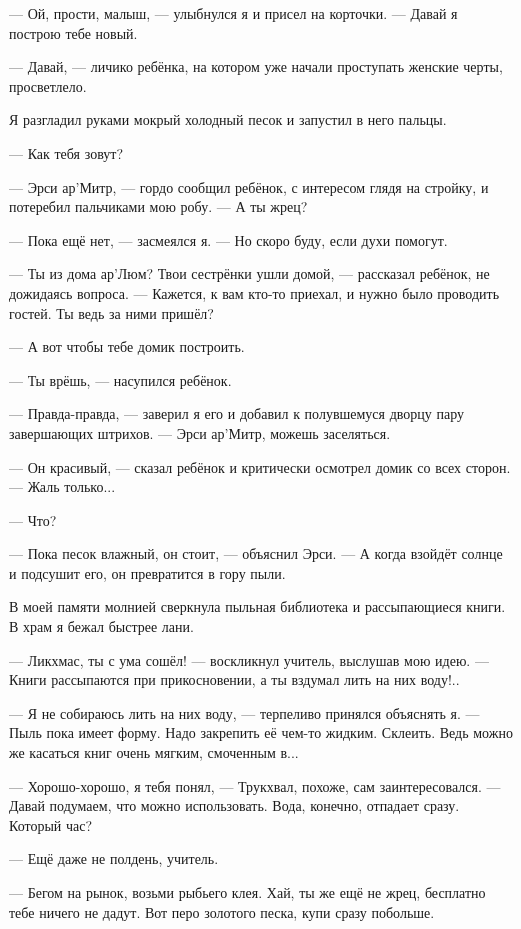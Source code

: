 --- Ой, прости, малыш, --- улыбнулся я и присел на корточки.
--- Давай я построю тебе новый.

--- Давай, --- личико ребёнка, на котором уже начали проступать женские черты, просветлело.

Я разгладил руками мокрый холодный песок и запустил в него пальцы.

--- Как тебя зовут?

--- Эрси ар’Митр, --- гордо сообщил ребёнок, с интересом глядя на стройку, и потеребил пальчиками мою робу.
--- А ты жрец?

--- Пока ещё нет, --- засмеялся я.
--- Но скоро буду, если духи помогут.

--- Ты из дома ар’Люм?
Твои сестрёнки ушли домой, --- рассказал ребёнок, не дожидаясь вопроса.
--- Кажется, к вам кто-то приехал, и нужно было проводить гостей.
Ты ведь за ними пришёл?

--- А вот чтобы тебе домик построить.

--- Ты врёшь, --- насупился ребёнок.

--- Правда-правда, --- заверил я его и добавил к полувшемуся дворцу пару завершающих штрихов.
--- Эрси ар’Митр, можешь заселяться.

--- Он красивый, --- сказал ребёнок и критически осмотрел домик со всех сторон.
--- Жаль только...

--- Что?

--- Пока песок влажный, он стоит, --- объяснил Эрси.
--- А когда взойдёт солнце и подсушит его, он превратится в гору пыли.

В моей памяти молнией сверкнула пыльная библиотека и рассыпающиеся книги.
В храм я бежал быстрее лани.

\asterism

--- Ликхмас, ты с ума сошёл! --- воскликнул учитель, выслушав мою идею.
--- Книги рассыпаются при прикосновении, а ты вздумал лить на них воду!..

--- Я не собираюсь лить на них воду, --- терпеливо принялся объяснять я.
--- Пыль пока имеет форму.
Надо закрепить её чем-то жидким.
Склеить.
Ведь можно же касаться книг очень мягким, смоченным в...

--- Хорошо-хорошо, я тебя понял, --- Трукхвал, похоже, сам заинтересовался.
--- Давай подумаем, что можно использовать.
Вода, конечно, отпадает сразу.
Который час?

--- Ещё даже не полдень, учитель.

--- Бегом на рынок, возьми рыбьего клея.
Хай, ты же ещё не жрец, бесплатно тебе ничего не дадут.
Вот перо золотого песка, купи сразу побольше.

